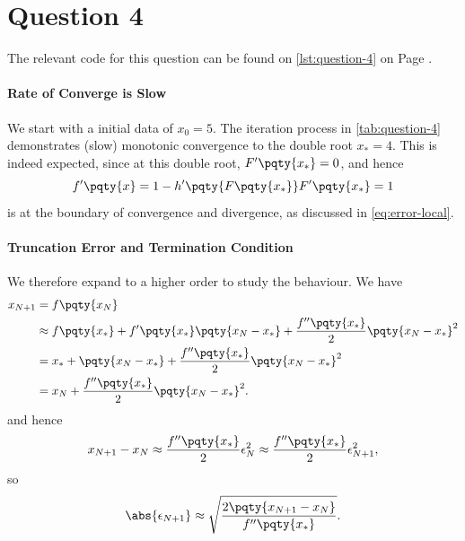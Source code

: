 \documentclass{article}
\begin{document}
\section{Question 4}

The relevant code for this question can be found on \autoref{lst:question-4} on Page \pageref{lst:question-4}.

\paragraph{Rate of Converge is Slow} We start with a initial data of \(x_0 = 5\). The iteration process in \autoref{tab:question-4} demonstrates (slow) monotonic convergence to the double root \(x_{\ast} = 4\). This is indeed expected, since at this double root, \(F'\pqty{x_\ast} = 0\), and hence
\begin{equation}
    f'\pqty{x} = 1 - h'\pqty{F\pqty{x_\ast}} F'\pqty{x_\ast} = 1
\end{equation}
is at the boundary of convergence and divergence, as discussed in \autoref{eq:error-local}.

\begin{table}[ht!]
    \centering
    \caption{Iteration Data for Convergence to Double Root \\ \small Horizontal Line is where \(x_N - x_{N - 1} < \num{1e-5}\)}
    
    \label{tab:question-4}%
\end{table}


\paragraph{Truncation Error and Termination Condition} We therefore expand to a higher order to study the behaviour. We have
\begin{equation}
    \label{eq:second-order-approximation}%
    \begin{aligned}
        x_{N + 1} &= f\pqty{x_N} \\
        &\approx f\pqty{x_\ast} + f'\pqty{x_\ast} \pqty{x_N - x_\ast} + \frac{f''\pqty{x_\ast}}{2} \pqty{x_N - x_\ast}^2 \\
        &= x_\ast + \pqty{x_N - x_\ast} + \frac{f''\pqty{x_\ast}}{2} \pqty{x_N - x_\ast}^2 \\
        &= x_N + \frac{f''\pqty{x_\ast}}{2} \pqty{x_N - x_\ast}^2.
    \end{aligned}
\end{equation}
and hence
\begin{equation}
    x_{N + 1} - x_N \approx \frac{f''\pqty{x_{\ast}}}{2} \epsilon_N^2 \approx \frac{f''\pqty{x_{\ast}}}{2} \epsilon_{N + 1}^2,
\end{equation}
so
\begin{equation}
    \abs{\epsilon_{N + 1}} \approx \sqrt{\frac{2 \pqty{x_{N + 1} - x_N}}{f''\pqty{x_{\ast}}}}.
\end{equation}
\end{document}
